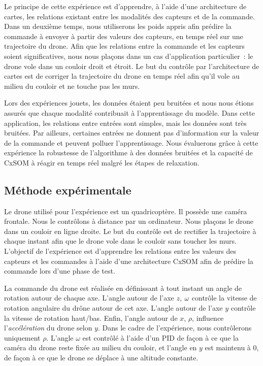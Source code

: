 \documentclass[../main]{subfiles}
\begin{document}
Le principe de cette expérience est d'apprendre, à l'aide d'une architecture de cartes, les relations existant entre les modalités des capteurs et de la commande. Dans un deuxième temps, nous utiliserons les poids appris afin prédire la commande à envoyer à partir des valeurs des capteurs, en temps réel sur une trajectoire du drone.
Afin que les relations entre la commande et les capteurs soient significatives, nous nous plaçons dans un cas d'application particulier~: le drone vole dans un couloir droit et étroit. Le but du contrôle par l'architecture de cartes est de corriger la trajectoire du drone en temps réel afin qu'il vole au milieu du couloir et ne touche pas les murs.

Lors des expériences jouets, les données étaient peu bruitées et nous nous étions assurés que chaque modalité contribuait à l'apprentissage du modèle. 
Dans cette application, les relations entre entrées sont simples, mais les données sont très bruitées. Par ailleurs, certaines entrées ne donnent pas d'information sur la valeur de la commande et peuvent polluer l'apprentissage.
Nous évaluerons grâce à cette expérience la robustesse de l'algorithme à des données bruitées et la capacité de CxSOM à réagir en temps réel malgré les étapes de relaxation.

\subsection{Méthode expérimentale}

Le drone utilisé pour l'expérience est un quadricoptère. Il possède une caméra frontale.
Nous le contrôlons à distance par un ordinateur. 
Nous plaçons le drone dans un couloir en ligne droite. Le but du contrôle est de rectifier la trajectoire à chaque instant afin que le drone vole dans le couloir sans toucher les murs. L'objectif de l'expérience est d'apprendre les relations entre les valeurs des capteurs et les commandes à l'aide d'une architecture CxSOM afin de prédire la commande lors d'une phase de test.

La commande du drone est réalisée en définissant à tout instant un angle de rotation autour de chaque axe. 
L'angle autour de l'axe $z$, $\omega$ contrôle la vitesse de rotation angulaire du drône autour de cet axe. L'angle autour de l'axe $y$ contrôle la vitesse de rotation haut/bas. Enfin, l'angle autour de $x$, $\rho$, influence l'\emph{accélération} du drone selon $y$.
Dans le cadre de l'expérience, nous contrôlerons uniquement $\rho$. L'angle $\omega$ est contrôlé à l'aide d'un PID de façon à ce que la caméra du drone reste fixée au milieu du couloir, et l'angle en $y$ est maintenu à 0, de façon à ce que le drone se déplace à une altitude constante.
\end{document}

